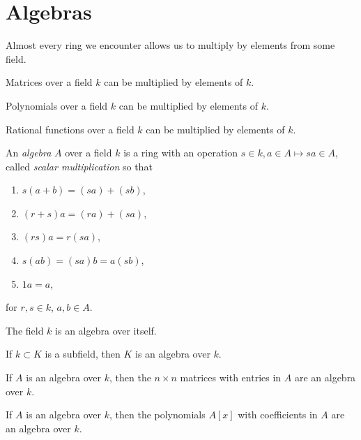 \section{Algebras}
Almost every ring we encounter allows us to multiply by elements from some field.
\begin{example}
Matrices over a field \(k\) can be multiplied by elements of \(k\).
\end{example}
\begin{example}
Polynomials over a field \(k\) can be multiplied by elements of \(k\).
\end{example}
\begin{example}
Rational functions over a field \(k\) can be multiplied by elements of \(k\).
\end{example}
An \emph{algebra} \(A\) over a field \(k\) is a ring with an operation \(s \in k, a \in A \mapsto sa \in A\), called \emph{scalar multiplication} so that
\begin{enumerate}
\item \(s(a+b)=(sa)+(sb)\), 
\item \((r+s)a=(ra)+(sa)\), 
\item \((rs)a=r(sa)\), 
\item \(s(ab)=(sa)b=a(sb)\),
\item \(1a=a\),
\end{enumerate}
for \(r,s \in k\), \(a, b \in A\).

\begin{example}
The field \(k\) is an algebra over itself.
\end{example}
\begin{example}
If \(k \subset K\) is a subfield, then \(K\) is an algebra over \(k\).
\end{example}
\begin{example}
If \(A\) is an algebra over \(k\), then the \(n \times n\) matrices with entries in \(A\) are an algebra over \(k\).
\end{example}
\begin{example}
If \(A\) is an algebra over \(k\), then the polynomials \(A[x]\) with coefficients in \(A\) are an algebra over \(k\).
\end{example}




